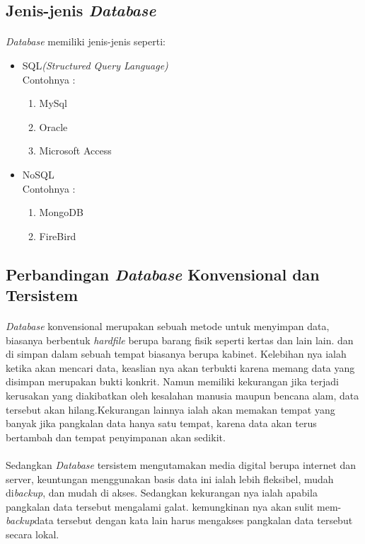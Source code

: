\documentclass[a4paper,12pt]{article}
\begin{document}
\subsection{Jenis-jenis \textit{Database}}
		\paragraph{}\textit{Database} memiliki jenis-jenis seperti:\\
		\begin{itemize}
		\item SQL\textit{(Structured Query Language)}\\
		Contohnya :
		\begin{enumerate}
		\item MySql
		\item Oracle
		\item Microsoft Access
		\end{enumerate}
		\item NoSQL\\
		Contohnya :
		\begin{enumerate}
		\item MongoDB
		\item FireBird
		\end{enumerate}
		\end{itemize}
\newpage
\subsection{Perbandingan \textit{Database} Konvensional dan Tersistem}
\paragraph{}\textit{Database} konvensional merupakan sebuah metode untuk menyimpan data, biasanya berbentuk \textit{hardfile} berupa barang fisik seperti kertas dan lain lain. dan di simpan dalam sebuah tempat biasanya berupa kabinet. Kelebihan nya ialah ketika akan mencari data, keaslian nya akan terbukti karena memang data yang disimpan merupakan bukti konkrit. Namun memiliki kekurangan jika terjadi kerusakan yang diakibatkan oleh kesalahan manusia maupun bencana alam, data tersebut akan hilang.Kekurangan lainnya ialah akan memakan tempat yang banyak jika pangkalan data hanya satu tempat, karena data akan terus bertambah dan tempat penyimpanan akan sedikit.
\paragraph{}Sedangkan \textit{Database} tersistem mengutamakan media digital berupa internet dan server, keuntungan menggunakan basis data ini ialah lebih fleksibel, mudah di\textit{backup}, dan mudah di akses. Sedangkan kekurangan nya ialah apabila pangkalan data tersebut mengalami galat. kemungkinan nya akan sulit mem-\textit{backup}data tersebut dengan kata lain harus mengakses pangkalan data tersebut secara lokal.
\end{document}
